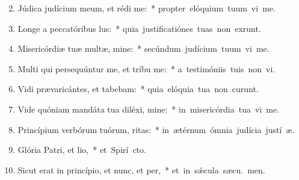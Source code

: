 \begin{flushleft}
\begin{enumerate}[leftmargin=*]
\setcounter{enumi}{1}

\item Júdica judícium meum, et rédi me:~* \mbox{propter elóquium tuum vi me.}
\item Longe a peccatóribus lus:~* \mbox{quia justificatiónes tuas non exrunt.}
\item Misericórdiæ tuæ multæ, mine:~* \mbox{secúndum judícium tuum vi me.}
\item Multi qui persequúntur me, et tríbu me:~* \mbox{a testimóniis tuis non vi.}
\item Vidi prævaricántes, et tabebam:~* \mbox{quia elóquia tua non curunt.}
\item Vide quóniam mandáta tua diléxi, mine:~* \mbox{in misericórdia tua vi me.}
\item Princípium verbórum tuórum, ritas:~* \mbox{in ætérnum ómnia judícia justí æ.}
\item Glória Patri, et lio,~* \mbox{et Spirí cto.}
\item Sicut erat in princípio, et nunc, et per,~* \mbox{et in s\'{\ae}cula sæcu. men.}


\end{enumerate}
\end{flushleft}

